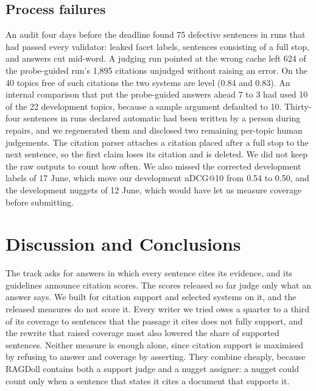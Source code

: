 \documentclass[sigconf,nonacm]{acmart}
\begin{document}
\subsection{Process failures}
\label{sec:process}
An audit four days before the deadline found 75 defective sentences in runs that had
passed every validator: leaked facet labels, sentences consisting of a full stop, and
answers cut mid-word. A judging run pointed at the wrong cache left 624 of the
probe-guided run's 1,895 citations unjudged without raising an error. On the 40
topics free of such citations the two systems are level (0.84 and 0.83). An internal
comparison that put the probe-guided answers ahead 7 to 3 had used 10 of the 22
development topics, because a sample argument defaulted to 10. Thirty-four sentences
in runs declared automatic had been written by a person during repairs, and we
regenerated them and disclosed two remaining per-topic human judgements. The
citation parser attaches a citation placed after a full stop to the next sentence, so
the first claim loses its citation and is deleted. We did not keep the raw outputs to
count how often. We also missed the corrected development labels of 17 June, which
move our development nDCG@10 from 0.54 to 0.50, and the development nuggets of
12 June, which would have let us measure coverage before submitting.

\section{Discussion and Conclusions}
\label{sec:discussion}

The track asks for answers in which every sentence cites its evidence, and its
guidelines announce citation scores. The scores released so far judge only what an
answer says. We built for citation support and selected systems on it, and the
released measures do not score it. Every writer we tried owes a quarter to a third of
its coverage to sentences that the passage it cites does not fully support, and the
rewrite that raised coverage most also lowered the share of supported sentences.
Neither measure is enough alone, since citation support is maximised by refusing to
answer and coverage by asserting. They combine cheaply, because RAGDoll contains both
a support judge and a nugget assigner: a nugget could count only when a sentence that
states it cites a document that supports it.
\end{document}
